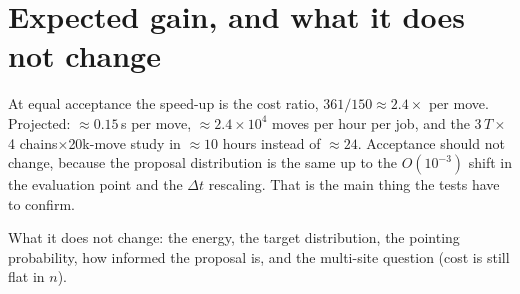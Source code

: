 \documentclass[11pt,a4paper]{article}
\newcommand{\dt}{\Delta t}
\begin{document}
\section{Expected gain, and what it does not change}
At equal acceptance the speed-up is the cost ratio, $361/150\approx2.4\times$ per
move. Projected: $\approx0.15$\,s per move, $\approx2.4\times10^4$ moves per hour
per job, and the 3\,$T\times$4 chains$\times$20k-move study in $\approx10$ hours
instead of $\approx24$. Acceptance should not change, because the proposal
distribution is the same up to the $O(10^{-3})$ shift in the evaluation point
and the $\dt$ rescaling. That is the main thing the tests have to confirm.

What it does not change: the energy, the target distribution, the pointing
probability, how informed the proposal is, and the multi-site question (cost is
still flat in $n$).

\end{document}
